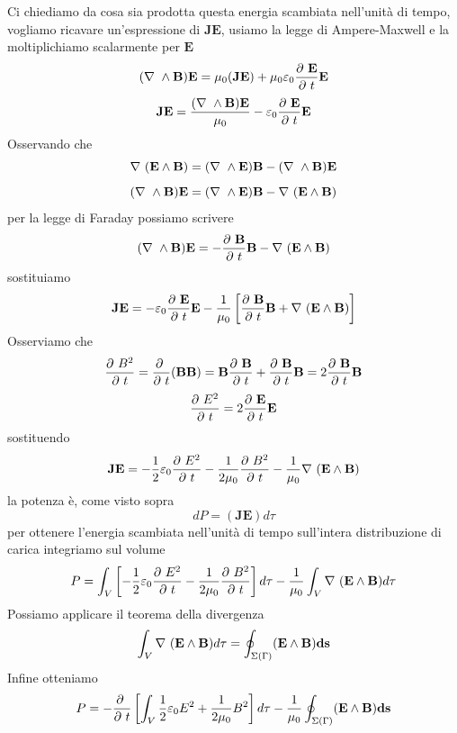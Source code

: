 \documentclass[
10pt, %
a4paper, %
oneside, %
headinclude,footinclude, %
BCOR5mm, %
]{scrartcl}
\begin{document}
Ci chiediamo da cosa sia prodotta questa energia scambiata nell'unità di tempo, vogliamo ricavare un'espressione di \(\mathbf{J}\mathbf{E}\), usiamo la legge di Ampere-Maxwell e la moltiplichiamo scalarmente per \(\mathbf{E}\)
\[(\nabla\ \wedge\mathbf{B})\mathbf{E} = \mu_0(\mathbf{J}\mathbf{E}) + \mu_0\varepsilon_0 \frac{\partial\  \mathbf{E}}{\partial\  t}\mathbf{E}\]
\[\mathbf{J}\mathbf{E} = \frac{(\nabla\ \wedge\mathbf{B})\mathbf{E}}{\mu_0}-\varepsilon_0\frac{\partial\  \mathbf{E}}{\partial\  t}\mathbf{E}\]
Osservando che
\[\nabla\ (\mathbf{E}\wedge\mathbf{B}) = (\nabla\ \wedge\mathbf{E})\mathbf{B}-(\nabla\ \wedge\mathbf{B})\mathbf{E}\]
\[(\nabla\ \wedge\mathbf{B})\mathbf{E} = (\nabla\ \wedge\mathbf{E})\mathbf{B}- \nabla\ (\mathbf{E}\wedge\mathbf{B})\]
per la legge di Faraday possiamo scrivere
\[(\nabla\ \wedge\mathbf{B})\mathbf{E} = -\frac{\partial\  \mathbf{B}}{\partial\  t}\mathbf{B}- \nabla\ (\mathbf{E}\wedge\mathbf{B})\]
sostituiamo
\[\mathbf{J}\mathbf{E} = -\varepsilon_0 \frac{\partial\  \mathbf{E}}{\partial\  t}\mathbf{E} -\frac{1}{\mu_0}\left[\frac{\partial\  \mathbf{B}}{\partial\  t}\mathbf{B}+\nabla\ (\mathbf{E}\wedge\mathbf{B})\right]\]
Osserviamo che 
\[\frac{\partial\  B^2}{\partial\  t} = \frac{\partial\  }{\partial\  t}(\mathbf{B}\mathbf{B}) = \mathbf{B}\frac{\partial\  \mathbf{B}}{\partial\  t}+\frac{\partial\  \mathbf{B}}{\partial\  t}\mathbf{B}=2\frac{\partial\  \mathbf{B}}{\partial\  t}\mathbf{B}\]
\[\frac{\partial\  E^2}{\partial\  t} = 2\frac{\partial\  \mathbf{E}}{\partial\  t}\mathbf{E}\]
sostituendo
\[\mathbf{J}\mathbf{E} = -\frac{1}{2}\varepsilon_0\frac{\partial\  E^2}{\partial\  t}-\frac{1}{2\mu_0}\frac{\partial\  B^2}{\partial\  t}-\frac{1}{\mu_0}\nabla\ (\mathbf{E}\wedge\mathbf{B})\]
la potenza è, come visto sopra
\[dP =  (\mathbf{J}\mathbf{E})d\tau\]
per ottenere l'energia scambiata nell'unità di tempo sull'intera distribuzione di carica integriamo sul volume
\[P = \int_V\left[ -\frac{1}{2}\varepsilon_0\frac{\partial\  E^2}{\partial\  t}-\frac{1}{2\mu_0}\frac{\partial\  B^2}{\partial\  t} \right] d\tau-\frac{1}{\mu_0}\int_V \nabla\ (\mathbf{E}\wedge\mathbf{B})d\tau \]
Possiamo applicare il teorema della divergenza
\[\int_V \nabla\ (\mathbf{E}\wedge\mathbf{B}) d\tau = \oint_{\Sigma(\Gamma)}(\mathbf{E}\wedge\mathbf{B})\mathbf{ds}\]
Infine otteniamo
\[P = -\frac{\partial\  }{\partial\  t}\left[\int_V \frac{1}{2}\varepsilon_0 E^2+\frac{1}{2\mu_0}B^2 \right] d\tau-\frac{1}{\mu_0}\oint_{\Sigma(\Gamma)}(\mathbf{E}\wedge\mathbf{B})\mathbf{ds}\]
\end{document}
